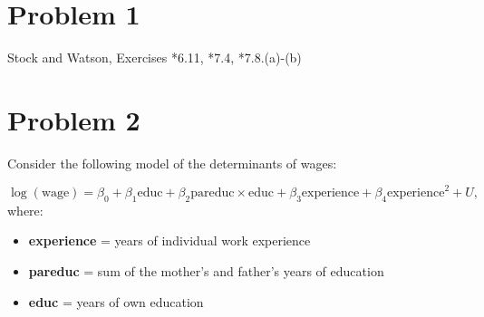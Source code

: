 \documentclass[11pt]{article}
\begin{document}
	

	\psetheader
\section*{Problem 1}

Stock and Watson, Exercises *6.11, *7.4, *7.8.(a)-(b)

\newpage
\section*{Problem 2}

Consider the following model of the determinants of wages:

\[
\log(\text{wage}) = \beta_0 + \beta_1 \text{educ} + \beta_2 \text{pareduc} \times \text{educ} + \beta_3 \text{experience} + \beta_4 \text{experience}^2 + U,
\]
where:
\begin{itemize}
    \item \textbf{experience} = years of individual work experience
    \item \textbf{pareduc} = sum of the mother's and father's years of education
    \item \textbf{educ} = years of own education
\end{itemize}
\end{document}
